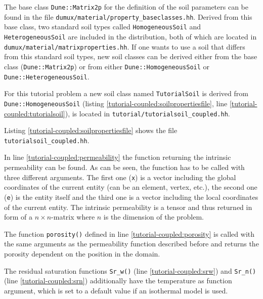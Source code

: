 The base class \texttt{Dune::Matrix2p} for the definition of the soil
parameters can be found in the file
\texttt{dumux/material/property\_baseclasses.hh}. Derived from this
base class, two standard soil types called \texttt{HomogeneousSoil}
and \texttt{HeterogeneousSoil} are included in the \Dumux
distribution, both of which are located in
\texttt{dumux/material/matrixproperties.hh}. If one wants to use a
soil that differs from this standard soil types, new soil classes can
be derived either from the base class (\texttt{Dune::Matrix2p}) or
from either \texttt{Dune::HomogeneousSoil} or
\texttt{Dune::HeterogeneousSoil}.

For this tutorial problem a new soil class named \texttt{TutorialSoil}
is derived from \texttt{Dune::HomogeneousSoil} (listing
\ref{tutorial-coupled:soilpropertiesfile}, line
\ref{tutorial-coupled:tutorialsoil}), is located in
\texttt{tutorial/tutorialsoil\_coupled.hh}.

Listing \ref{tutorial-coupled:soilpropertiesfile} shows the file
\texttt{tutorialsoil\_coupled.hh}.

\begin{lst}\label{tutorial-coupled:soilpropertiesfile} \mbox{}

\end{lst}

In line \ref{tutorial-coupled:permeability} the function returning the
intrinsic permeability can be found. As can be seen, the function has
to be called with three different arguments. The first one
(\texttt{x}) is a vector including the global coordinates of the
current entity (can be an element, vertex, etc.), the second one
(\texttt{e}) is the entity itself and the third one is a vector
including the local coordinates of the current entity. The intrinsic
permeability is a tensor and thus returned in form of a $n \times
n$-matrix where $n$ is the dimension of the problem.

The function \texttt{porosity()} defined in line
\ref{tutorial-coupled:porosity} is called with the same arguments as
the permeability function described before and returns the porosity
dependent on the position in the domain.

The residual saturation functions \texttt{Sr\_w()} (line
\ref{tutorial-coupled:srw}) and \texttt{Sr\_n()} (line
\ref{tutorial-coupled:srn}) additionally have the temperature as
function argument, which is set to a default value if an isothermal
model is used.

